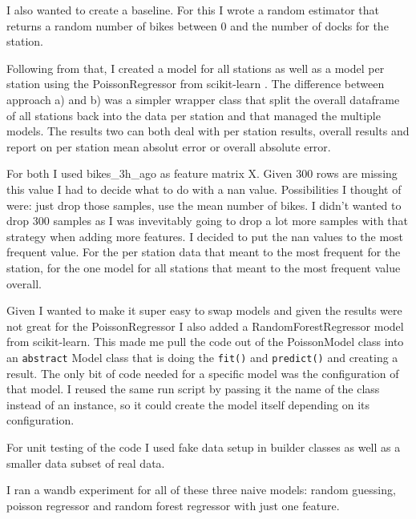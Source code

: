 \documentclass[a4paper]{article}
\begin{document}
    I also wanted to create a baseline. For this I wrote a random estimator that returns a random number of bikes between
    0 and the number of docks for the station.

    Following from that, I created a model for all stations as well as a model per station using the PoissonRegressor from
    scikit-learn \cite{scikit-learn}. The difference between approach a) and b) was a simpler wrapper class that split the
    overall dataframe of all stations back into the data per station and that managed the multiple models. The results
    two can both deal with per station results, overall results and report on per station mean absolut error or
    overall absolute error.

    For both I used bikes\_3h\_ago as feature matrix X. Given 300 rows are missing this value I had to decide what to do
    with a nan value. Possibilities I thought of were: just drop those samples, use the mean number of bikes. I didn't wanted
    to drop 300 samples as I was invevitably going to drop a lot more samples with that strategy when adding more features.
    I decided to put the nan values to the most frequent value. For the per station data that meant to the most frequent for
    the station, for the one model for all stations that meant to the most frequent value overall.

    Given I wanted to make it super easy to swap models and given the results were not great for the PoissonRegressor
    I also added a RandomForestRegressor model from scikit-learn. This made me pull the code out of the PoissonModel class
    into an \texttt{abstract} Model class that is doing the \texttt{fit()} and \texttt{predict()} and creating a result.
    The only bit of code needed for a specific model was the configuration of that model. I reused the same run script
    by passing it the name of the class instead of an instance, so it could create the model itself depending on its configuration.

    For unit testing of the code I used fake data setup in builder classes as well as a smaller data subset of real data.

    I ran a wandb experiment for all of these three naive models: random guessing, poisson regressor and random forest
    regressor with just one feature.

\end{document}
